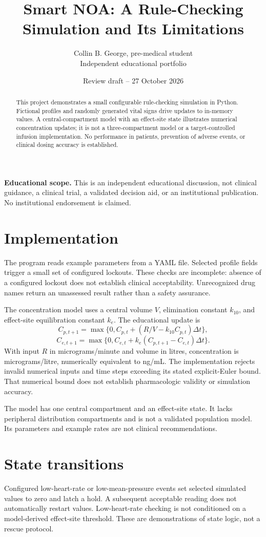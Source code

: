 \documentclass[11pt]{article}
\title{Smart NOA: A Rule-Checking Simulation and Its Limitations}
\author{Collin B. George, pre-medical student\\Independent educational portfolio}
\date{Review draft -- 27 October 2026}
\begin{document}
\maketitle
\noindent\textbf{Educational scope.} This is an independent educational discussion, not clinical guidance, a clinical trial, a validated decision aid, or an institutional publication. No institutional endorsement is claimed.

\begin{abstract}
This project demonstrates a small configurable rule-checking simulation in Python. Fictional profiles and randomly generated vital signs drive updates to in-memory values. A central-compartment model with an effect-site state illustrates numerical concentration updates; it is not a three-compartment model or a target-controlled infusion implementation. No performance in patients, prevention of adverse events, or clinical dosing accuracy is established.
\end{abstract}
\section{Implementation}
The program reads example parameters from a YAML file. Selected profile fields trigger a small set of configured lockouts. These checks are incomplete: absence of a configured lockout does not establish clinical acceptability. Unrecognized drug names return an unassessed result rather than a safety assurance.

The concentration model uses a central volume $V$, elimination constant $k_{10}$, and effect-site equilibration constant $k_e$. The educational update is
\[
C_{p,t+1}=\max\{0,C_{p,t}+(R/V-k_{10}C_{p,t})\Delta t\},
\]
\[
C_{e,t+1}=\max\{0,C_{e,t}+k_e(C_{p,t+1}-C_{e,t})\Delta t\}.
\]
With input $R$ in micrograms/minute and volume in litres, concentration is micrograms/litre, numerically equivalent to ng/mL. The implementation rejects invalid numerical inputs and time steps exceeding its stated explicit-Euler bound. That numerical bound does not establish pharmacologic validity or simulation accuracy.

The model has one central compartment and an effect-site state. It lacks peripheral distribution compartments and is not a validated population model. Its parameters and example rates are not clinical recommendations.
\section{State transitions}
Configured low-heart-rate or low-mean-pressure events set selected simulated values to zero and latch a hold. A subsequent acceptable reading does not automatically restart values. Low-heart-rate checking is not conditioned on a model-derived effect-site threshold. These are demonstrations of state logic, not a rescue protocol.
\end{document}
